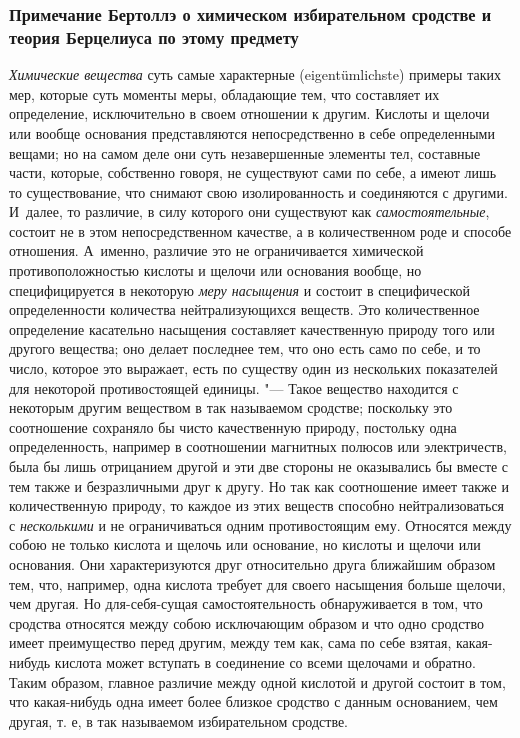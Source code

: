 \subsubsection[Примечание Бертоллэ о химическом избирательном сродстве и теория Берцелиуса по этому предмету]
{Примечание Бертоллэ о химическом избирательном сродстве и теория Берцелиуса по этому предмету}

{\em Химические вещества} суть самые характерные
(eigentümlichste) примеры таких мер, которые суть моменты меры, обладающие
тем, что составляет их определение, исключительно в своем отношении к
другим. Кислоты и щелочи или вообще основания представляются
непосредственно в себе определенными вещами; но на самом деле они суть
незавершенные элементы тел, составные части, которые, собственно говоря, не
существуют сами по себе, а имеют лишь то существование, что снимают свою
изолированность и соединяются с другими. И~далее, то различие, в силу
которого они существуют как {\em самостоятельные},
состоит не в этом непосредственном качестве, а в количественном роде и
способе отношения. А~именно, различие это не ограничивается химической
противоположностью кислоты и щелочи или основания вообще, но
специфицируется в некоторую {\em меру насыщения} и
состоит в специфической определенности количества нейтрализующихся веществ.
Это количественное определение касательно насыщения составляет качественную
природу того или другого вещества; оно делает последнее тем, что оно есть
само по себе, и то число, которое это выражает, есть по существу один из
нескольких показателей для некоторой противостоящей единицы. "--- Такое
вещество находится с некоторым другим веществом в так называемом сродстве;
поскольку это соотношение сохраняло бы чисто качественную природу,
постольку одна определенность, например в соотношении магнитных полюсов или
электричеств, была бы лишь отрицанием другой и эти две стороны не
оказывались бы вместе с тем также и безразличными друг к другу. Но так как
соотношение имеет также и количественную природу, то каждое из этих веществ
способно нейтрализоваться с {\em несколькими} и не
ограничиваться одним противостоящим ему. Относятся между собою не только
кислота и щелочь или основание, но кислоты и щелочи или основания. Они
характеризуются друг относительно друга ближайшим образом тем, что,
например, одна кислота требует для своего насыщения больше щелочи, чем
другая. Но для-себя-сущая самостоятельность обнаруживается в том, что
сродства относятся между собою исключающим образом и что одно сродство
имеет преимущество перед другим, между тем как, сама по себе взятая,
какая-нибудь кислота может вступать в соединение со всеми щелочами и
обратно. Таким образом, главное различие между одной кислотой и другой
состоит в том, что какая-нибудь одна имеет более близкое сродство с данным
основанием, чем другая, т. е, в так называемом избирательном сродстве.

